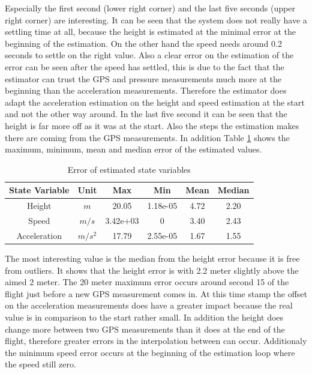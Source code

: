 Especially the first second (lower right corner) and the last five seconds (upper right corner) are interesting.
It can be seen that the system does not really have a settling time at all,
because the height is estimated at the minimal error at the beginning of the estimation.
On the other hand the speed needs around 0.2 seconds to settle on the right value.
Also a clear error on the estimation of the error can be seen after the speed has settled,
this is due to the fact that the estimator can trust the GPS and pressure measurements much more at the beginning than the acceleration measurements.
Therefore the estimator does adapt the acceleration estimation on the height and speed estimation at the start and not the other way around.
In the last five second it can be seen that the height is far more off as it was at the start.
Also the steps the estimation makes there are coming from the GPS measurements.
In addition Table \ref{tab:ErrorPointMass} shows the maximum, minimum, mean and median error of the estimated values.

\begin{table}[h!]
\centering
\begin{tabular}{cccccc}
\hline
\multicolumn{1}{|c|}{State Variable} & \multicolumn{1}{c|}{Unit} & \multicolumn{1}{c|}{Max} & \multicolumn{1}{c|}{Min} & \multicolumn{1}{c|}{Mean} & \multicolumn{1}{c|}{Median} \\ \hline
Height                            & $m$                         & 20.05                  & 1.18e-05                 & 4.72                    & 2.20                      \\
Speed                             & $m/s$                       & 3.42e+03               & 0                        & 3.40                    & 2.43                      \\
Acceleration                       & $m/s^2$   			& 17.79                  & 2.55e-05                 & 1.67                    & 1.55
\end{tabular}
\caption{Error of estimated state variables}
\label{tab:ErrorPointMass}
\end{table}

The most interesting value is the median from the height error because it is free from outliers.
It shows that the height error is with 2.2 meter slightly above the aimed 2 meter.
The 20 meter maximum error occurs around second 15 of the flight just before a new GPS measurement comes in.
At this time stamp the offset on the acceleration measurements does have a greater impact because the real value is in comparison to the start rather small.
In addition the height does change more between two GPS measurements than it does at the end of the flight, therefore greater errors in the interpolation between can occur.
Additionaly the minimum speed error occurs at the beginning of the estimation loop where the speed still zero.


